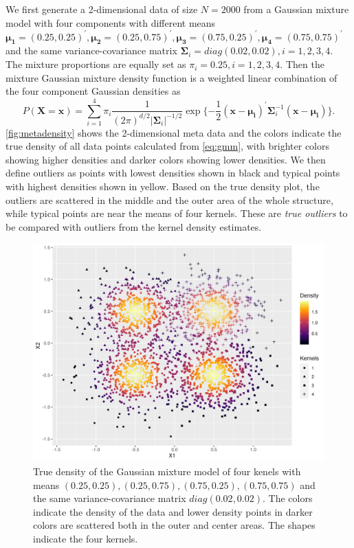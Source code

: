 \documentclass[11pt,a4paper,]{article}
\begin{document}
We first generate a 2-dimensional data of size \(N=2000\) from a Gaussian
mixture model with four components with different means
\(\pmb{\mu_1}=(0.25, 0.25)^\prime, \pmb{\mu_2}=(0.25, 0.75)^\prime, \pmb{\mu_3}=(0.75, 0.25)^\prime, \pmb{\mu_4}=(0.75, 0.75)^\prime\)
and the same variance-covariance matrix
\(\pmb{\Sigma}_i=diag(0.02, 0.02), i=1,2,3,4\). The mixture proportions
are equally set as \(\pi_i=0.25, i=1,2,3,4\).
Then the mixture Gaussian mixture density function is a weighted linear
combination of the four component Gaussian densities as \begin{equation}
\label{eq:gmm}
P(\pmb{X}=\pmb{x}) = \sum_{i=1}^{4}\pi_i \frac{1}{(2\pi)^{d/2}|\pmb{\Sigma}_i|^{-1/2}} \exp{\{-\frac{1}{2} (\pmb{x}-\pmb{\mu_i})^\prime \pmb{\Sigma}_i^{-1} (\pmb{x}-\pmb{\mu_i}) \}}.
\end{equation} \autoref{fig:metadensity} shows the 2-dimensional meta
data and the colors indicate the true density of all data points
calculated from \eqref{eq:gmm}, with brighter colors showing higher
densities and darker colors showing lower densities. We then define
outliers as points with lowest densities shown in black and typical
points with highest densities shown in yellow. Based on the true density
plot, the outliers are scattered in the middle and the outer area of the
whole structure, while typical points are near the means of four
kernels. These are \emph{true outliers} to be compared with outliers from the
kernel density estimates.

\begin{figure}

{\centering \includegraphics[width=0.8\linewidth]{figures/truedensity_4kernels} 

}

\caption{True density of the Gaussian mixture model of four kenels with means $(0.25, 0.25), (0.25, 0.75), (0.75, 0.25), (0.75, 0.75)$ and the same variance-covariance matrix $diag(0.02, 0.02)$. The colors indicate the density of the data and lower density points in darker colors are scattered both in the outer and center areas. The shapes indicate the four kernels.}\label{fig:metadensity}
\end{figure}
\end{document}
